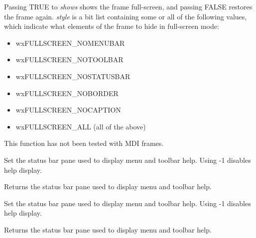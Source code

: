 
Passing TRUE to {\it shows} shows the frame full-screen, and passing FALSE restores the frame
again. {\it style} is a bit list containing some or all of the following values, which
indicate what elements of the frame to hide in full-screen mode:

\begin{itemize}\itemsep=0pt
\item wxFULLSCREEN\_NOMENUBAR
\item wxFULLSCREEN\_NOTOOLBAR
\item wxFULLSCREEN\_NOSTATUSBAR
\item wxFULLSCREEN\_NOBORDER
\item wxFULLSCREEN\_NOCAPTION
\item wxFULLSCREEN\_ALL (all of the above)
\end{itemize}

This function has not been tested with MDI frames.



\label{wxframesetstatusbarpane}


Set the status bar pane used to display menu and toolbar help.
Using -1 disables help display.

\label{wxframegetstatusbarpane}


Returns the status bar pane used to display menu and toolbar help.



\label{wxframesetstatusbarpane}


Set the status bar pane used to display menu and toolbar help.
Using -1 disables help display.

\label{wxframegetstatusbarpane}


Returns the status bar pane used to display menu and toolbar help.





